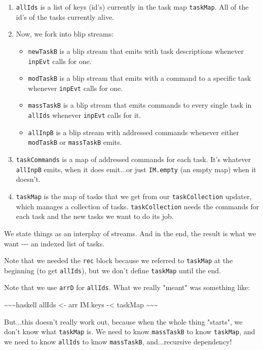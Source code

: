 \documentclass[]{article}
\begin{document}
\begin{enumerate}
\item
  \texttt{allIds} is a list of keys (id's) currently in the task map
  \texttt{taskMap}. All of the id's of the tasks currently alive.
\item
  Now, we fork into blip streams:

  \begin{itemize}
  \tightlist
  \item
    \texttt{newTaskB} is a blip stream that emits with task descriptions
    whenever \texttt{inpEvt} calls for one.
  \item
    \texttt{modTaskB} is a blip stream that emits with a command to a specific
    task whenever \texttt{inpEvt} calls for one.
  \item
    \texttt{massTaskB} is a blip stream that emits commands to every single task
    in \texttt{allIds} whenever \texttt{inpEvt} calls for it.
  \item
    \texttt{allInpB} is a blip stream with addressed commands whenever either
    \texttt{modTaskB} or \texttt{massTaskB} emits.
  \end{itemize}
\item
  \texttt{taskCommands} is a map of addressed commands for each task. It's
  whatever \texttt{allInpB} emits, when it does emit...or just \texttt{IM.empty}
  (an empty map) when it doesn't.
\item
  \texttt{taskMap} is the map of tasks that we get from our
  \texttt{taskCollection} updater, which manages a collection of tasks.
  \texttt{taskCollection} needs the commands for each task and the new tasks we
  want to do its job.
\end{enumerate}

We state things as an interplay of streams. And in the end, the result is what
we want -\/-\/- an indexed list of tasks.

Note that we needed the \texttt{rec} block because we referred to
\texttt{taskMap} at the beginning (to get \texttt{allIds}), but we don't define
\texttt{taskMap} until the end.

Note that we use \texttt{arrD} for \texttt{allIds}. What we really "meant" was
something like:

\textasciitilde{}\textasciitilde{}\textasciitilde{}haskell allIds \textless{}-
arr IM.keys -\textless{} taskMap
\textasciitilde{}\textasciitilde{}\textasciitilde{}

But...this doesn't really work out, because when the whole thing "starts", we
don't know what \texttt{taskMap} is. We need to know \texttt{massTaskB} to know
\texttt{taskMap}, and we need to know \texttt{allIds} to know
\texttt{massTaskB}, and...recursive dependency!
\end{document}
